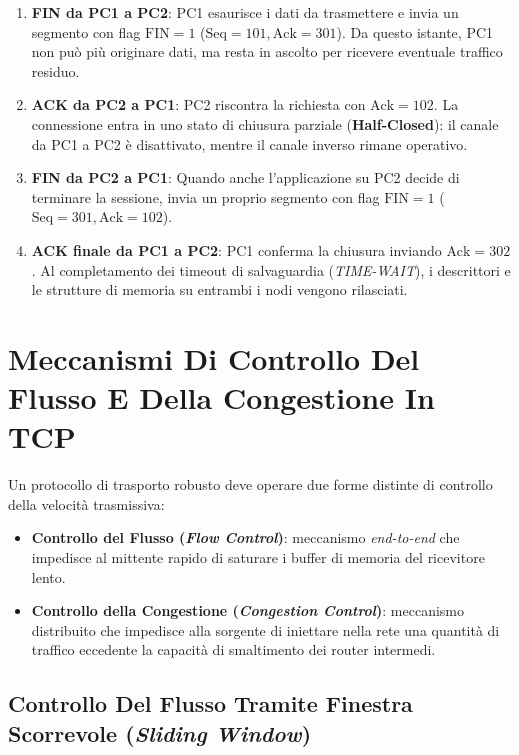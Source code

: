 \documentclass[11pt, a4paper]{article}
\begin{document}

\begin{enumerate}
    \item \textbf{FIN da PC1 a PC2}: PC1 esaurisce i dati da trasmettere e invia un segmento con flag $\text{FIN}=1$ ($\text{Seq}=101, \text{Ack}=301$). Da questo istante, PC1 non può più originare dati, ma resta in ascolto per ricevere eventuale traffico residuo.
    \item \textbf{ACK da PC2 a PC1}: PC2 riscontra la richiesta con $\text{Ack}=102$. La connessione entra in uno stato di chiusura parziale (\textbf{Half-Closed}): il canale da PC1 a PC2 è disattivato, mentre il canale inverso rimane operativo.
    \item \textbf{FIN da PC2 a PC1}: Quando anche l'applicazione su PC2 decide di terminare la sessione, invia un proprio segmento con flag $\text{FIN}=1$ ($\text{Seq}=301, \text{Ack}=102$).
    \item \textbf{ACK finale da PC1 a PC2}: PC1 conferma la chiusura inviando $\text{Ack}=302$. Al completamento dei timeout di salvaguardia (\emph{TIME-WAIT}), i descrittori e le strutture di memoria su entrambi i nodi vengono rilasciati.
\end{enumerate}

\newpage

\section{Meccanismi Di Controllo Del Flusso E Della Congestione In TCP}

Un protocollo di trasporto robusto deve operare due forme distinte di controllo della velocità trasmissiva:
\begin{itemize}[noitemsep]
    \item \textbf{Controllo del Flusso (\emph{Flow Control})}: meccanismo \emph{end-to-end} che impedisce al mittente rapido di saturare i buffer di memoria del ricevitore lento.
    \item \textbf{Controllo della Congestione (\emph{Congestion Control})}: meccanismo distribuito che impedisce alla sorgente di iniettare nella rete una quantità di traffico eccedente la capacità di smaltimento dei router intermedi.
\end{itemize}

\subsection{Controllo Del Flusso Tramite Finestra Scorrevole (\emph{Sliding Window})}
\end{document}
